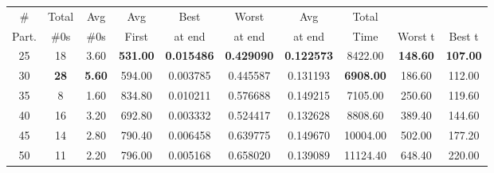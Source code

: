 \begin{table}[h]
	\centering
	\tiny \begin{tabular}{cccccccccc}
		\hline
		\cellcolor[HTML]{C0C0C0}\#       & Total   & Avg   & Avg     & Best    & Worst   & Avg  & Total   &       &                            \\
		\cellcolor[HTML]{C0C0C0} Part. &     \#0s & \#0s   &First  &  at end  & at end &at end & Time & Worst t  &          Best t                     \\ 
		\hline
		\cellcolor[HTML]{C0C0C0}25          & 18            & {\color[HTML]{3166FF} 3.60} & \textbf{531.00}                & \textbf{0.015486}               & \textbf{0.429090}               & \textbf{0.122573}               & 8422.00                         & \textbf{148.60}                & \textbf{107.00}               \\
		\cellcolor[HTML]{C0C0C0}30          & \textbf{28}           & \textbf{5.60}               & {\color[HTML]{3166FF} 594.00}  & {\color[HTML]{3166FF} 0.003785} & {\color[HTML]{3166FF} 0.445587} & {\color[HTML]{3166FF} 0.131193} & \textbf{6908.00}                & {\color[HTML]{3166FF} 186.60}  & {\color[HTML]{3166FF} 112.00} \\
		\cellcolor[HTML]{C0C0C0}35          & 8             & 1.60                        & 834.80                         & 0.010211                        & 0.576688                        & 0.149215                        & {\color[HTML]{3166FF} 7105.00}  & 250.60                         & 119.60                        \\
		\cellcolor[HTML]{C0C0C0}40          & 16            & 3.20                        & 692.80                         & 0.003332                        & 0.524417                        & 0.132628                        & 8808.60                         & 389.40                         & 144.60                        \\
		\cellcolor[HTML]{C0C0C0}45          & 14            & 2.80                        & 790.40                         & 0.006458                        & 0.639775                        & {\color[HTML]{FE0000} 0.149670} & 10004.00                        & 502.00                         & 177.20                        \\
		\cellcolor[HTML]{C0C0C0}50          & 11            & 2.20                        & 796.00                         & {\color[HTML]{FE0000} 0.005168} & {\color[HTML]{FE0000} 0.658020} & 0.139089                        & 11124.40                        & 648.40                         & 220.00                        \\

\end{tabular}
\end{table}
